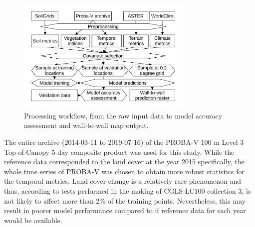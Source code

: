 \documentclass[review,authoryear,3p]{elsarticle}
\begin{document}
\begin{figure}
 \centering
 \includegraphics[width=0.75\textwidth]{article-figures/flowcharts/2020-07-10-flowchart}
 \caption{Processing workflow, from the raw input data to model accuracy assessment and wall-to-wall map output.}
 \label{fig-processing}
\end{figure}


\label{sec-temporal-filter}

The entire archive (2014-03-11 to 2019-07-16) of the PROBA-V 100 m Level 3 Top-of-Canopy 5-day composite product \citep{dierckx2014probav,probavguide2} was used for this study.
While the reference data corresponded to the land cover at the year 2015 specifically, the whole time series of PROBA-V was chosen to obtain more robust statistics for the temporal metrics.
Land cover change is a relatively rare phenomenon and thus, according to tests performed in the making of \gls{CGLS-LC100} collection 3, is not likely to affect more than 2\% of the training points.
Nevertheless, this may result in poorer model performance compared to if reference data for each year would be available.
\end{document}
